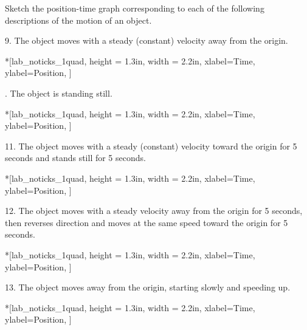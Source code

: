 Sketch the position-time graph corresponding to each of the following descriptions
of the motion of an object.

9. The object moves with a steady (constant) velocity away from the origin.

\begin{lab_axis}*[lab_noticks_1quad,
	height = {1.3in}, width = {2.2in},
	xlabel={Time},
	ylabel={Position},
	]
\end{lab_axis}

. The object is standing still.

\begin{lab_axis}*[lab_noticks_1quad,
	height = {1.3in}, width = {2.2in},
	xlabel={Time},
	ylabel={Position},
	]
\end{lab_axis}

11. The object moves with a steady (constant) velocity toward the origin for
5 seconds and stands still for 5 seconds.

\begin{lab_axis}*[lab_noticks_1quad,
	height = {1.3in}, width = {2.2in},
	xlabel={Time},
	ylabel={Position},
	]
\end{lab_axis}

12. The object moves with a steady velocity away from the origin for 5 seconds,
then reverses direction and moves at the same speed toward the origin for 5
seconds.

\begin{lab_axis}*[lab_noticks_1quad,
	height = {1.3in}, width = {2.2in},
	xlabel={Time},
	ylabel={Position},
	]
\end{lab_axis}

13. The object moves away from the origin, starting slowly and speeding up.

\begin{lab_axis}*[lab_noticks_1quad,
	height = {1.3in}, width = {2.2in},
	xlabel={Time},
	ylabel={Position},
	]
\end{lab_axis}


